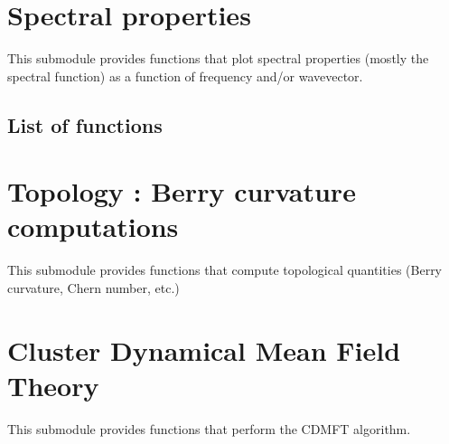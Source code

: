 \documentclass[letterpaper,10pt,english]{sphinxmanual}
\begin{document}

\begin{fulllineitems}
\label{\detokenize{functions:pyqcm.model_instance}}

\begin{fulllineitems}
\label{\detokenize{functions:pyqcm.model_instance.__init__}}
\end{fulllineitems}


\end{fulllineitems}



\chapter{Spectral properties}
\label{\detokenize{spectral:spectral-properties}}\label{\detokenize{spectral::doc}}
\sphinxAtStartPar
This submodule provides functions that plot spectral properties (mostly the spectral function) as a function of frequency and/or wavevector.


\section{List of functions}
\label{\detokenize{spectral:list-of-functions}}

\chapter{Topology : Berry curvature computations}
\label{\detokenize{berry:topology-berry-curvature-computations}}\label{\detokenize{berry::doc}}
\sphinxAtStartPar
This submodule provides functions that compute topological quantities (Berry curvature, Chern number, etc.)


\chapter{Cluster Dynamical Mean Field Theory}
\label{\detokenize{cdmft:cluster-dynamical-mean-field-theory}}\label{\detokenize{cdmft::doc}}
\sphinxAtStartPar
This submodule provides functions that perform the CDMFT algorithm.
\end{document}

